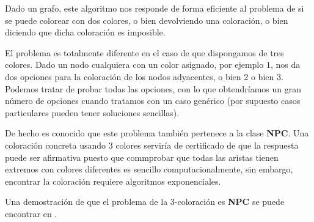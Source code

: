 Dado un grafo, este algoritmo nos responde de forma eficiente al problema de
si se puede colorear con dos colores, o bien devolviendo una coloraci\'on, o bien
diciendo que dicha coloraci\'on es imposible.

El problema es totalmente diferente en el caso de que dispongamos de tres colores.
Dado un nodo cualquiera con un color asignado, por ejemplo $1$, nos da dos opciones
para la coloraci\'on de los nodos adyacentes, o bien $2$ o bien $3$. Podemos tratar
de probar todas las opciones, con lo que obtendr\'iamos un gran n\'umero de opciones
cuando tratamos con un caso gen\'erico (por supuesto casos particulares pueden tener
soluciones sencillas).

De hecho es conocido que este problema tambi\'en pertenece a la clase {\bf NPC}. Una coloraci\'on
concreta usando $3$ colores servir\'ia de certificado de que la respuesta puede ser afirmativa puesto
que commprobar que todas las aristas tienen extremos con colores diferentes es sencillo
computacionalmente, sin embargo, encontrar la coloraci\'on requiere algoritmos exponenciales.

Una demostraci\'on de que el problema de la 3-coloraci\'on es {\bf NPC} se puede encontrar
en \cite[Problem 34-3]{algoBB}.

\hfil
